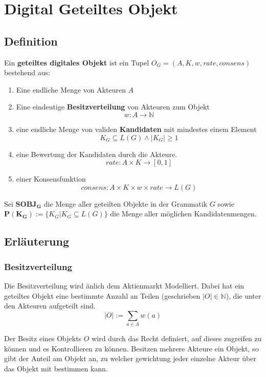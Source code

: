 \documentclass[]{article}
\begin{document}
\newpage
\section{Digital Geteiltes Objekt}
\subsection{Definition}

Ein \textbf{geteiltes digitales Objekt} ist ein Tupel $O_G=(A, K, w, rate, consens)$ bestehend aus:

\begin{enumerate}
\item Eine endliche Menge von Akteuren $A$
\item Eine eindeutige \textbf{Besitzverteilung} von Akteuren zum Objekt
  \[w: A \rightarrow \mathbb{N}\]
\item eine endliche Menge von validen \textbf{Kandidaten} mit mindestes einem Element 
  \[K_G \subseteq L(G) \land |K_G| \geq 1\] 
\item eine Bewertung der Kandidaten durch die Akteure. 
  \[rate: A\times K \rightarrow [0,1]\]
\item einer Konsensfunktion
  \[consens: A\times K\times w \times rate \rightarrow L(G)\] 
\end{enumerate}

Sei $\mathbf{SOBJ_G}$ die Menge aller geteilten Objekte in der Grammatik $G$ sowie 
 $\mathbf{P(K_G)}:= \{ K_G | K_G \subseteq L(G) \}$ die Menge aller möglichen Kandidatenmengen.

\subsection {Erläuterung}


\subsubsection*{Besitzverteilung}


Die Besitzverteilung wird änlich dem Aktienmarkt Modelliert. Dabei hat ein geteiltes Objekt eine bestimmte Anzahl an Teilen (geschrieben $|O| \in \mathbb{N}$), die unter den Akteuren aufgeteilt sind. 
\[ |O| := \sum_{a \in A} w(a) \] 

Der Besitz eines Objekts $O$ wird durch das Recht definiert, auf dieses zugreifen zu können und es Kontrollieren zu können\cite{Waldron2004}. Besitzen mehrere Akteure ein Objekt, so gibt der Anteil am Objekt an, zu welcher gewichtung jeder einzelne Akteur über das Objekt mit bestimmen kann.
\end{document}
